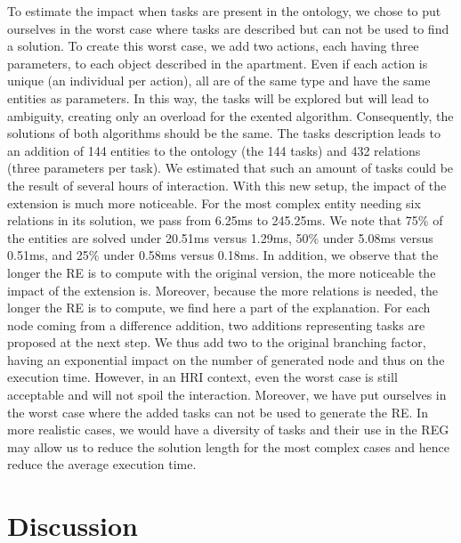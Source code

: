 To estimate the impact when tasks are present in the ontology, we chose to put ourselves in the worst case where tasks are described but can not be used to find a solution. To create this worst case, we add two actions, each having three parameters, to each object described in the apartment. Even if each action is unique (an individual per action), all are of the same type and have the same entities as parameters. In this way, the tasks will be explored but will lead to ambiguity, creating only an overload for the exented algorithm. Consequently, the solutions of both algorithms should be the same. The tasks description leads to an addition of 144 entities to the ontology (the 144 tasks) and 432 relations (three parameters per task). We estimated that such an amount of tasks could be the result of several hours of interaction. With this new setup, the impact of the extension is much more noticeable. For the most complex entity needing six relations in its solution, we pass from 6.25ms to 245.25ms. We note that 75\% of the entities are solved under 20.51ms versus 1.29ms, 50\% under 5.08ms versus 0.51ms, and 25\% under 0.58ms versus 0.18ms. In addition, we observe that the longer the RE is to compute with the original version, the more noticeable the impact of the extension is. Moreover, because the more relations is needed, the longer the RE is to compute, we find here a part of the explanation. For each node coming from a difference addition, two additions representing tasks are proposed at the next step. We thus add two to the original branching factor, having an exponential impact on the number of generated node and thus on the execution time. However, in an HRI context, even the worst case is still acceptable and will not spoil the interaction. Moreover, we have put ourselves in the worst case where the added tasks can not be used to generate the RE. In more realistic cases, we would have a diversity of tasks and their use in the REG may allow us to reduce the solution length for the most complex cases and hence reduce the average execution time.

\section{Discussion}